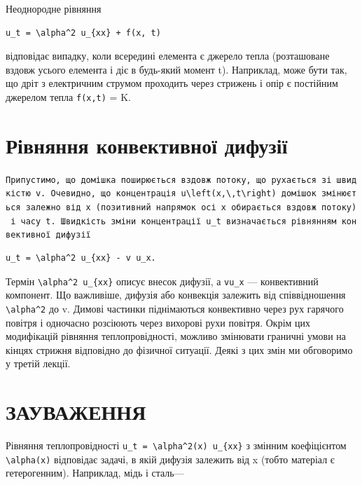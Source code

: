 \documentclass[
  ukrainian,
]{article}
\begin{document}
Неоднородне рівняння

\begin{verbatim}
u_t = \alpha^2 u_{xx} + f(x, t)
\end{verbatim}

відповідає випадку, коли всередині елемента є джерело тепла (розташоване
вздовж усього елемента і діє в будь-який момент t). Наприклад, може бути
так, що дріт з електричним струмом проходить через стрижень і опір є
постійним джерелом тепла \texttt{f(x,t)} = K.

\section{Рівняння конвективної
дифузії}\label{ux440ux456ux432ux43dux44fux43dux43dux44f-ux43aux43eux43dux432ux435ux43aux442ux438ux432ux43dux43eux457-ux434ux438ux444ux443ux437ux456ux457}

\texttt{Припустимо,\ що\ домішка\ поширюється\ вздовж\ потоку,\ що\ рухається\ зі\ швидкістю\ v.\ Очевидно,\ що\ концентрація\ \textquotesingle{}u\textbackslash{}left(x,\textbackslash{},t\textbackslash{}right)\textquotesingle{}\ домішок\ змінюється\ залежно\ від\ x\ (позитивний\ напрямок\ осі\ x\ обирається\ вздовж\ потоку)\ і\ часу\ t.\ Швидкість\ зміни\ концентрації\ \textquotesingle{}u\_t\textquotesingle{}\ визначається\ рівнянням\ конвективної\ дифузії}

\begin{verbatim}
u_t = \alpha^2 u_{xx} - v u_x.
\end{verbatim}

Термін \texttt{\textbackslash{}alpha\^{}2\ u\_\{xx\}} описує внесок
дифузії, а \texttt{vu\_x} --- конвективний компонент. Що важливіше,
дифузія або конвекція залежить від співвідношення
\texttt{\textbackslash{}alpha\^{}2} до v. Димові частинки піднімаються
конвективно через рух гарячого повітря і одночасно розсіюють через
вихорові рухи повітря. Окрім цих модифікацій рівняння теплопровідності,
можливо змінювати граничні умови на кінцях стрижня відповідно до
фізичної ситуації. Деякі з цих змін ми обговоримо у третій лекції.

\section{ЗАУВАЖЕННЯ}\label{ux437ux430ux443ux432ux430ux436ux435ux43dux43dux44f}

Рівняння теплопровідності
\texttt{u\_t\ =\ \textbackslash{}alpha\^{}2(x)\ u\_\{xx\}} з змінним
коефіцієнтом \texttt{\textbackslash{}alpha(x)} відповідає задачі, в якій
дифузія залежить від x (тобто матеріал є гетерогенним). Наприклад, мідь
і сталь---
\end{document}
